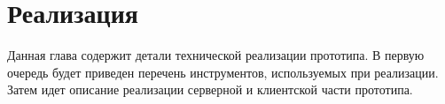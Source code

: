 ﻿\section{Реализация}

Данная глава содержит  детали технической реализации прототипа.
В первую очередь будет приведен перечень инструментов,
используемых при реализации.
Затем идет описание реализации серверной и клиентской части прототипа.





